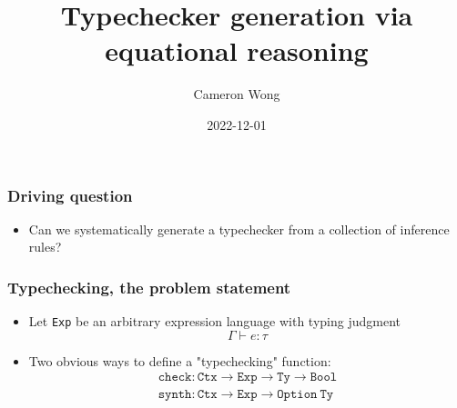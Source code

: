 \documentclass[usenames,dvipsnames]{beamer}
\title[]{Typechecker generation via equational reasoning}
\author{Cameron Wong} %
\institute[CS-252R]{CS-252R final project}
\date{2022-12-01} %
\newcommand{\Exp}{\texttt{Exp}}
\newcommand{\Type}{\texttt{Ty}}
\newcommand{\Ctx}{\texttt{Ctx}}
\newcommand{\synth}{\texttt{synth}}
\renewcommand{\check}{\texttt{check}}
\begin{document}
\begin{frame}
\titlepage %
\end{frame}



\begin{frame}
  \frametitle{Driving question}

  \begin{itemize}
    \item Can we systematically generate a typechecker from a collection of
      inference rules?
  \end{itemize}
\end{frame}


\begin{frame}
  \frametitle{Typechecking, the problem statement}

  \begin{itemize}
    \item Let \Exp{} be an arbitrary expression language with typing judgment
      \begin{equation*}
        \Gamma \vdash e : \tau
      \end{equation*}
    \item Two obvious ways to define a "typechecking" function:
      \begin{align}
        \check : \Ctx \rightarrow \Exp \rightarrow \Type \rightarrow \texttt{Bool} \\
        \synth : \Ctx \rightarrow \Exp \rightarrow \texttt{Option}\ \Type
      \end{align}
  \end{itemize}
\end{frame}
\end{document}
